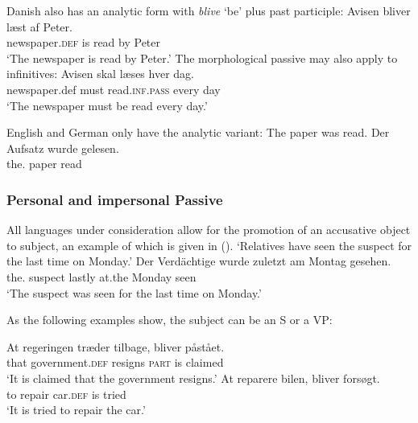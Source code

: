 Danish also has an analytic form with \emph{blive} `be' plus past participle: 
\ea
\gll Avisen                 bliver læst af Peter.\\
     newspaper.\textsc{def} is     read by Peter\\\danish
\glt `The newspaper is read by Peter.'
\z
The morphological passive may also apply to infinitives:
\ea
\gll Avisen skal læses hver dag.\\
     newspaper.def must read.\textsc{inf}.\textsc{pass} every day\\\danish
\glt `The newspaper must be read every day.'
\z


English and German only have the analytic variant:
\eal
\ex The paper was read.
\ex 
\gll Der        Aufsatz wurde  gelesen.\\
     the.\NOM{} paper   \AUX{} read\\\german
\zl    





\subsubsection{Personal and impersonal Passive}
\label{sec-impersonal-passive-phen}

All languages under consideration allow for the promotion of an accusative object to subject, an
example of which is given in ().
\eal
\ex
{}
\glt `Relatives have seen the suspect for the last time on Monday.'
\ex 
\gll Der        Verdächtige wurde  zuletzt am Montag gesehen.\\
     the.\NOM{} suspect     \AUX{} lastly at.the Monday seen\\
\glt `The suspect was seen for the last time on Monday.'
\zl

\noindent
As the following examples show, the subject can be an S or a VP:

\eal
\ex
\gll At regeringen træder tilbage, bliver påstået.\\
     that government.\textsc{def} resigns \textsc{part} is claimed\\\danish
\glt `It is claimed that the government resigns.'
\ex
\gll At reparere bilen, bliver forsøgt.\\
     to repair car.\textsc{def} is tried\\
\glt `It is tried to repair the car.'
\zl

